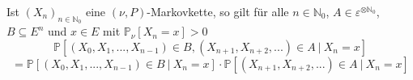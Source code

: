 Ist $(X_{n})_{n \in \mathbb{N}_{0}}$  eine $(\nu,P)$-Markovkette, so gilt für alle $n \in \mathbb{N}_{0}$, $A \in \varepsilon^{ \otimes \mathbb{N}_{0}}$, $B \subseteq E^{n}$ und $x \in E$ mit $\mathbb{P}_{\nu}[X_{n} = x]>0$
\begin{equation*}
\mathbb{P}[(X_{0},X_{1},...,X_{n-1}) \in  B, (X_{n+1}, X_{n+2},...) \in A \: | \: X_{n} = x]
\end{equation*}
\begin{equation*}
= \mathbb{P}[(X_{0},X_{1},...,X_{n-1}) \in  B \: | \: X_{n} = x] \cdot \mathbb{P}[(X_{n+1}, X_{n+2},...) \in A \: | \: X_{n} = x]
\end{equation*}
